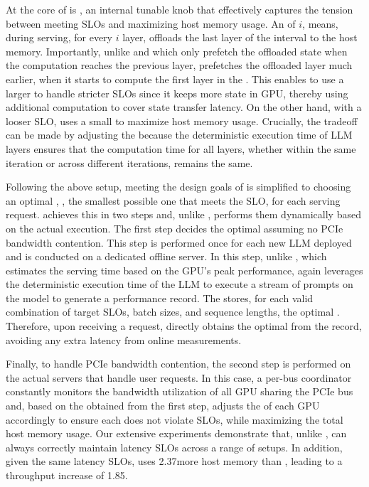 At the core of \sys is \interval, 
an internal tunable knob that effectively captures the tension between meeting SLOs and maximizing host memory usage. 
%
An \interval of $i$, means, during serving, for every $i$ layer, \sys offloads the last layer of the interval to the host memory. 
%
Importantly, unlike \deepspeed and \flexgen which only prefetch the offloaded state when the computation reaches the previous layer, \sys prefetches 
the offloaded layer much earlier, 
when it starts to compute the first layer in the \interval. 
%
This enables \sys to use a larger \interval to handle stricter SLOs since it keeps more state in GPU, thereby using 
additional computation to cover state transfer latency.   
%
On the other hand, with a looser SLO, \sys uses a small \interval to maximize 
host memory usage. 
%
Crucially, the tradeoff can be made by adjusting the \interval because the deterministic execution time of LLM layers ensures that the computation time for all layers, 
whether within the same iteration or across different iterations, remains the same. 

Following the above setup, meeting the design goals of \sys is simplified 
to choosing an optimal \interval, \ie, the smallest possible one that meets the SLO, for each serving request. 
%
\sys achieves this in two steps and, unlike \flexgen, performs them dynamically based on the actual execution.  
%
The first step decides the optimal \interval assuming no PCIe bandwidth contention. 
%
This step is performed once for each new LLM deployed and is conducted on a dedicated offline server. 
%
In this step, unlike \flexgen, which estimates the serving time based on the GPU's peak performance, 
\sys again leverages the deterministic execution time of the LLM to execute a stream of prompts on the model to generate a performance record. 
%
The \record stores, for each valid combination of target SLOs, batch sizes, and sequence lengths, the optimal \interval.  
%
Therefore, upon receiving a request, \sys directly obtains the optimal 
\interval from the record, avoiding any extra latency from online measurements. 
%


Finally, to handle PCIe bandwidth contention, the second step is performed on the actual servers that handle user requests. 
%
In this case, a per-bus coordinator constantly 
monitors the bandwidth utilization of all GPU sharing the PCIe bus 
and, based on the \interval obtained from the first step, 
adjusts the \interval of each GPU accordingly to ensure each does not violate SLOs, while maximizing the total host memory usage.  
%
Our extensive experiments demonstrate that, unlike \deepspeed, \sys can 
always correctly maintain latency SLOs across a range of setups. 
%
In addition, given the same latency SLOs, \sys uses 2.37\X more host memory than \flexgen, leading to a throughput increase of 1.85\X. 
%

